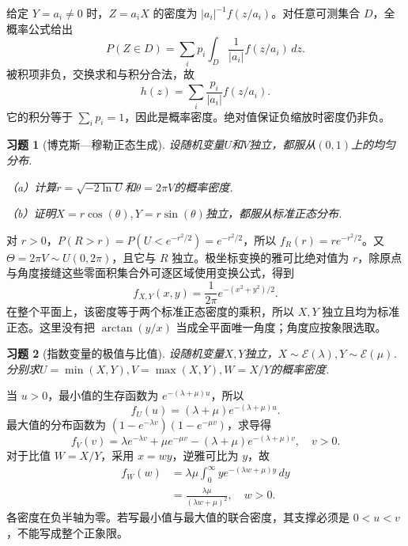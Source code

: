 \documentclass[12pt,fontset=fandol]{ctexart}
\newtheorem{exercise}{习题}[section]
\begin{document}
\begin{solve}\label{a:Y4.22}给定 $Y=a_i\ne0$ 时，$Z=a_iX$ 的密度为 $|a_i|^{-1}f(z/a_i)$。对任意可测集合 $D$，全概率公式给出\[P(Z\in D)=\sum_i p_i\int_D\frac1{|a_i|}f(z/a_i)\,dz.\]被积项非负，交换求和与积分合法，故\[h(z)=\sum_i\frac{p_i}{|a_i|}f(z/a_i).\]它的积分等于 $\sum_i p_i=1$，因此是概率密度。绝对值保证负缩放时密度仍非负。\end{solve}

\begin{exercise}[博克斯—穆勒正态生成]\label{q:Y4.25}
设随机变量$U$和$V$独立，都服从$(0,1)$上的均匀分布.

（a）计算$r=\sqrt{-2\ln U}$和$\theta=2\pi V$的概率密度.

（b）证明$X=r\cos(\theta),Y=r\sin(\theta)$独立，都服从标准正态分布.\par{}
\end{exercise}

\begin{solve}\label{a:Y4.25}对 $r>0$，$P(R>r)=P(U<e^{-r^2/2})=e^{-r^2/2}$，所以 $f_R(r)=re^{-r^2/2}$。又 $\Theta=2\pi V\sim U(0,2\pi)$，且它与 $R$ 独立。极坐标变换的雅可比绝对值为 $r$，除原点与角度接缝这些零面积集合外可逐区域使用变换公式，得到\[f_{X,Y}(x,y)=\frac1{2\pi}e^{-(x^2+y^2)/2}.\]在整个平面上，该密度等于两个标准正态密度的乘积，所以 $X,Y$ 独立且均为标准正态。这里没有把 $\arctan(y/x)$ 当成全平面唯一角度；角度应按象限选取。\end{solve}

\begin{exercise}[指数变量的极值与比值]\label{q:Y4.30}
设随机变量$X,Y$独立，$X\sim \mathscr{E}(\lambda),Y\sim \mathscr{E}(\mu)$.分别求$U=\min (X,Y),V=\max(X,Y),W=X/Y$的概率密度.\par{}
\end{exercise}

\begin{solve}\label{a:Y4.30}当 $u>0$，最小值的生存函数为 $e^{-(\lambda+\mu)u}$，所以\[f_U(u)=(\lambda+\mu)e^{-(\lambda+\mu)u}.\]最大值的分布函数为 $(1-e^{-\lambda v})(1-e^{-\mu v})$，求导得\[f_V(v)=\lambda e^{-\lambda v}+\mu e^{-\mu v}-(\lambda+\mu)e^{-(\lambda+\mu)v},\quad v>0.\]对于比值 $W=X/Y$，采用 $x=wy$，逆雅可比为 $y$，故\[\begin{aligned}f_W(w)&=\lambda\mu\int_0^\infty ye^{-(\lambda w+\mu)y}\,dy\\&=\frac{\lambda\mu}{(\lambda w+\mu)^2},\quad w>0.\end{aligned}\]各密度在负半轴为零。若写最小值与最大值的联合密度，其支撑必须是 $0<u<v$，不能写成整个正象限。\end{solve}
\end{document}
